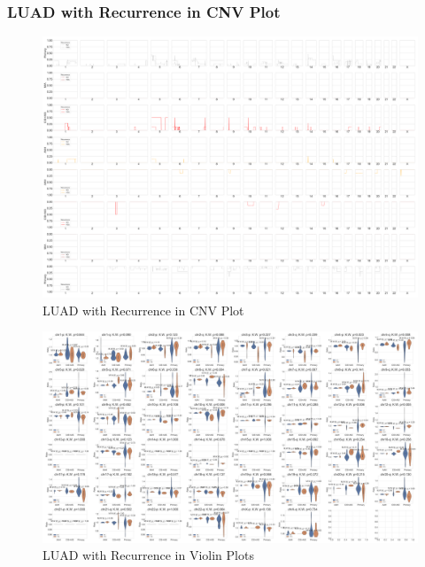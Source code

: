 \documentclass{beamer}
\begin{document}
    \begin{frame}[allowframebreaks]
        \frametitle{LUAD with Recurrence in CNV Plot}

        \begin{figure}
            \includegraphics[width=0.6 \linewidth]{figures/PureCN/BWA-simple-ADC.Recurrence.pdf}
            \caption{LUAD with Recurrence in CNV Plot}
        \end{figure}

        \begin{figure}
            \includegraphics[width=0.8 \linewidth]{figures/PureCN/BWA-violin-ADC.Recurrence.pdf}
            \caption{LUAD with Recurrence in Violin Plots}
        \end{figure}
    \end{frame}
\end{document}
